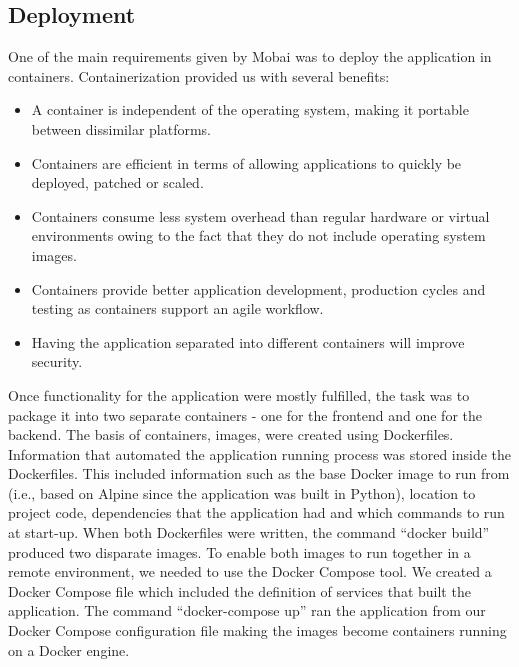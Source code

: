 

\subsection{Deployment}
One of the main requirements given by Mobai was to deploy the application in containers. Containerization \cite{Containerization} provided us with several benefits:
\begin{itemize}
    \item A container is independent of the operating system, making it portable between dissimilar platforms. 
    \item Containers are efficient in terms of allowing applications to quickly be deployed, patched or scaled. 
    \item Containers consume less system overhead than regular hardware or virtual environments owing to the fact that they do not include operating system images. 
    \item Containers provide better application development, production cycles and testing as containers support an agile workflow.
    \item Having the application separated into different containers will improve security.
\end{itemize}

Once functionality for the application were mostly fulfilled, the task was to package it into two separate containers - one for the frontend and one for the backend. The basis of containers, images, were created using Dockerfiles. Information that automated the application running process was stored inside the Dockerfiles. This included information such as the base Docker image to run from (i.e., based on Alpine since the application was built in Python), location to project code, dependencies that the application had and which commands to run at start-up. When both Dockerfiles were written, the command ``docker build'' produced two disparate images. To enable both images to run together in a remote environment, we needed to use the Docker Compose tool. We created a Docker Compose file which included the definition of services that built the application. The command ``docker-compose up'' ran the application from our Docker Compose configuration file making the images become containers running on a Docker engine.

